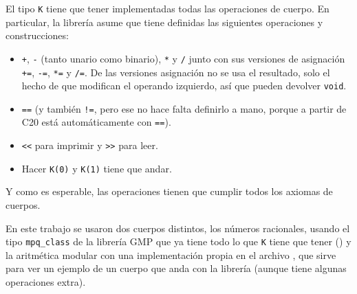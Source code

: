\documentclass[12pt]{report}
\theoremstyle{customstyle}
\theoremstyle{factstyle}
\newcommand\cppXX{C\nolinebreak[4]\hspace{-.05em}\raisebox{.4ex}{\relsize{-3}{\textbf{++}}}20\xspace}
\begin{document}
El tipo \texttt{K} tiene que tener implementadas todas las operaciones de cuerpo. En particular, la librería asume que tiene definidas las siguientes operaciones y construcciones:

\begin{itemize}
  \item \texttt{+}, \texttt{-} (tanto unario como binario), \texttt{*} y \texttt{/} junto con sus versiones de asignación \texttt{+=}, \texttt{-=}, \texttt{*=} y \texttt{/=}. De las versiones asignación no se usa el resultado, solo el hecho de que modifican el operando izquierdo, así que pueden devolver \texttt{void}.
  \item \texttt{==} (y también \texttt{!=}, pero ese no hace falta definirlo a mano, porque a partir de \cppXX está automáticamente con \texttt{==}).
  \item \texttt{<<} para imprimir y \texttt{>>} para leer.
  \item Hacer \texttt{K(0)} y \texttt{K(1)} tiene que andar.
\end{itemize}

Y como es esperable, las operaciones tienen que cumplir todos los axiomas de cuerpos.

En este trabajo se usaron dos cuerpos distintos, los números racionales, usando el tipo \texttt{mpq\_class} de la librería GMP que ya tiene todo lo que \texttt{K} tiene que tener (\cite{lib:gmp}) y la aritmética modular con una implementación propia en el archivo , que sirve para ver un ejemplo de un cuerpo que anda con la librería (aunque tiene algunas operaciones extra).
\end{document}
